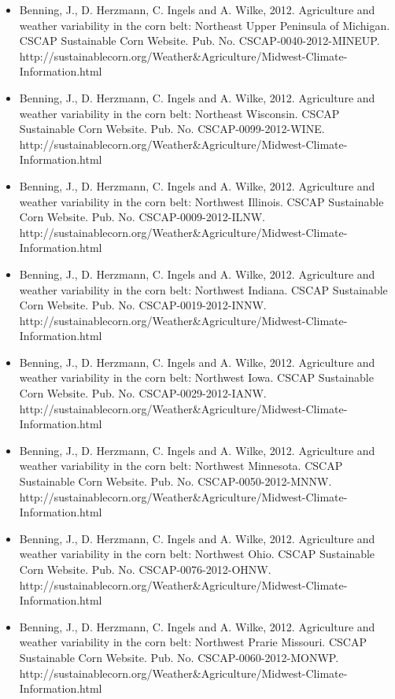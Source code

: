 \begin{itemize}
\item Benning, J., D. Herzmann, C. Ingels and A. Wilke, 2012. Agriculture and weather variability in the corn belt: Northeast Upper Peninsula of Michigan. CSCAP Sustainable Corn Website. Pub. No. CSCAP-0040-2012-MINEUP. http://sustainablecorn.org/Weather\&Agriculture/Midwest-Climate-Information.html

\item Benning, J., D. Herzmann, C. Ingels and A. Wilke, 2012. Agriculture and weather variability in the corn belt: Northeast Wisconsin. CSCAP Sustainable Corn Website. Pub. No. CSCAP-0099-2012-WINE. http://sustainablecorn.org/Weather\&Agriculture/Midwest-Climate-Information.html

\item Benning, J., D. Herzmann, C. Ingels and A. Wilke, 2012. Agriculture and weather variability in the corn belt: Northwest Illinois. CSCAP Sustainable Corn Website. Pub. No. CSCAP-0009-2012-ILNW. http://sustainablecorn.org/Weather\&Agriculture/Midwest-Climate-Information.html

\item Benning, J., D. Herzmann, C. Ingels and A. Wilke, 2012. Agriculture and weather variability in the corn belt: Northwest Indiana. CSCAP Sustainable Corn Website. Pub. No. CSCAP-0019-2012-INNW. http://sustainablecorn.org/Weather\&Agriculture/Midwest-Climate-Information.html

\item Benning, J., D. Herzmann, C. Ingels and A. Wilke, 2012. Agriculture and weather variability in the corn belt: Northwest Iowa. CSCAP Sustainable Corn Website. Pub. No. CSCAP-0029-2012-IANW. http://sustainablecorn.org/Weather\&Agriculture/Midwest-Climate-Information.html

\item Benning, J., D. Herzmann, C. Ingels and A. Wilke, 2012. Agriculture and weather variability in the corn belt: Northwest Minnesota. CSCAP Sustainable Corn Website. Pub. No. CSCAP-0050-2012-MNNW. http://sustainablecorn.org/Weather\&Agriculture/Midwest-Climate-Information.html

\item Benning, J., D. Herzmann, C. Ingels and A. Wilke, 2012. Agriculture and weather variability in the corn belt: Northwest Ohio. CSCAP Sustainable Corn Website. Pub. No. CSCAP-0076-2012-OHNW. http://sustainablecorn.org/Weather\&Agriculture/Midwest-Climate-Information.html

\item Benning, J., D. Herzmann, C. Ingels and A. Wilke, 2012. Agriculture and weather variability in the corn belt: Northwest Prarie Missouri. CSCAP Sustainable Corn Website. Pub. No. CSCAP-0060-2012-MONWP. http://sustainablecorn.org/Weather\&Agriculture/Midwest-Climate-Information.html


\end{itemize}
